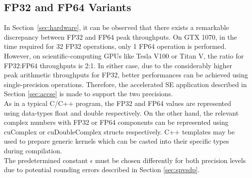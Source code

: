 \documentclass[thesis.tex]{subfiles}
\begin{document}
\subsection{FP32 and FP64 Variants}
In Section~\ref{sec:hardware}, it can be observed that there exists a remarkable discrepancy between FP32 and FP64 peak throughputs. On GTX 1070, in the time required for 32 FP32 operations, only 1 FP64 operation is performed. However, on scientific-computing GPUs like Tesla V100 or Titan V, the ratio for FP32:FP64 throughputs is 2:1. In either case, due to the considerably higher peak arithmetic throughputs for FP32, better performances can be achieved using single-precision operations. Therefore, the accelerated SE application described in Section \ref{sec:accse} is made to support the two precisions. \\
As in a typical C/C++ program, the FP32 and FP64 values are represented using data-types float and double respectively. On the other hand, the relevant complex numbers with FP32 or FP64 components can be represented using cuComplex or cuDoubleComplex structs respectively. C++ templates may be used to prepare generic kernels which can be casted into their specific types during compilation.\\
The predetermined constant $\epsilon$ must be chosen differently for both precision levels due to potential rounding errors described in Section \ref{sec:spvsdp}.
\end{document}
